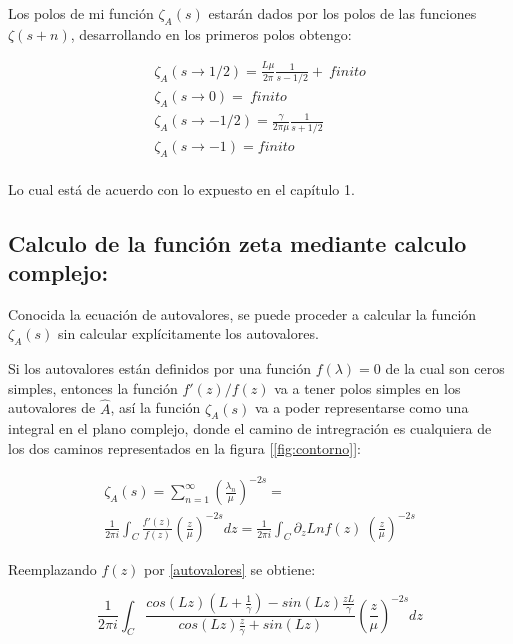 Los polos de mi función $\zeta _A (s)$ estarán dados por los polos de las funciones $\zeta (s+n)$, desarrollando en los primeros polos obtengo:

\begin{equation}
\begin{array}{c}
\zeta _A (s \rightarrow 1/2) = 
\frac{L \mu }{2 \pi } \frac{1}{s-1/2} + \ finito \\
\zeta _A (s \rightarrow 0) = \ finito \\
\zeta _A (s \rightarrow -1/2) = \frac{\gamma}{2 \pi \mu } \frac{1}{s+1/2} \\
\zeta _A (s \rightarrow -1) = finito \\
\end{array}
\end{equation}

Lo cual está de acuerdo con lo expuesto en el capítulo 1.

\subsection{Calculo de la función zeta mediante calculo complejo:}

Conocida la ecuación de autovalores, se puede proceder a calcular la función $\zeta _A (s) $ sin calcular explícitamente los autovalores.

Si los  autovalores están definidos por una función $f(\lambda ) = 0$ de la cual son ceros simples, entonces la función $f'(z) / f(z) $ va a tener polos simples en los autovalores de $\hat{A}$, así la  función $\zeta _A (s)$ va a poder representarse como una integral en el plano complejo, donde el camino de intregración es cualquiera de los dos caminos representados en la figura [\ref{fig:contorno}]:

\begin{equation}
\begin{array}{c}
   \zeta _A (s) =  \sum _{n=1} ^{\infty} \left( \frac{\lambda _n}{\mu} \right) ^{-2s} =  \\
   \frac{1}{2 \pi i} \int _{C} \frac{f'(z)}{f(z)} \left( \frac{z}{\mu} \right) ^{-2s} dz =  
	\frac{1}{2 \pi i} \int _{C} \partial _z Ln f(z) \ 
	\left( \frac{z}{\mu} \right) ^{-2s}

\end{array}
\label{asd}
\end{equation}

Reemplazando $f(z)$ por  \ref{autovalores} se obtiene:

\begin{equation}
    \frac{1}{2 \pi i} \int _{C}
    \frac{ cos(L z) \left(L + \frac{1}{\gamma} \right) - sin(L z) \frac{z L}{\gamma}
    }
    {cos(L z) \frac{z}{\gamma} + sin(L z)
    }
    \left( \frac{z}{\mu} \right) ^{-2 s} dz
\end{equation}


